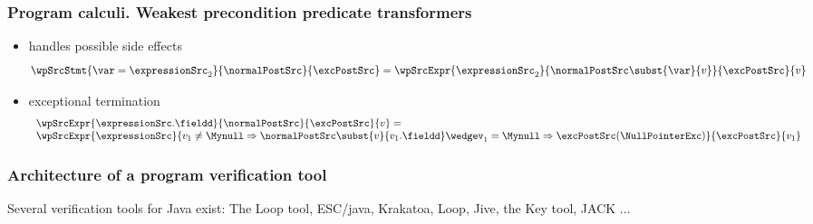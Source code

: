 \documentclass{beamer}
\begin{document}
 \begin{frame}\frametitle{Program calculi. Weakest precondition predicate transformers}
	   \begin{itemize}
	      \item handles possible side effects
		{\tiny $$ \wpSrcStmt{ \var = \expressionSrc_2}{\normalPostSrc }{ \excPostSrc } =
                  \wpSrcExpr{\expressionSrc_2 }{ 
				    \normalPostSrc \subst{\var}{v}   
				   }{ \excPostSrc}{v} 
		  $$ } 
	      \item exceptional termination 
		{\tiny $$   \begin{array}{l}  \wpSrcExpr{\expressionSrc.\fieldd  }{\normalPostSrc }{ \excPostSrc }{v}  = \\
	                        \wpSrcExpr{\expressionSrc }{%
						        v_1 \neq \Mynull \Rightarrow \normalPostSrc \subst{v}{v_1.\fieldd} %
			                                \wedge%
						        v_1 = \Mynull \Rightarrow%
							       \excPostSrc(\NullPointerExc ) %
							        
						   }{%
					    \excPostSrc }{v_1}  
				\end{array} $$ }
	      
	  \end{itemize}
 \end{frame}


\begin{frame}[shrink]\frametitle{Architecture of a program verification tool}
\begin{center}
\end{center}

Several verification tools for Java exist:  The Loop tool, ESC/java, Krakatoa, Loop, Jive, the Key tool, JACK ...
\end{frame}
\end{document}
